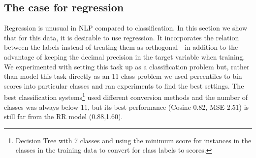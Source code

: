 \documentclass[11pt,letterpaper]{article}
\begin{document}
\begin{table}[ht!]
\caption{Cosine Test Results Breakdown.}
\label{tbl:submissionsCosineBreakdown}
\end{table}

\subsection{The case for regression} 
\label{subsec:forregression}
Regression is unusual in NLP compared to classification. In this section we show that for this data, it is desirable to use regression. %
It incorporates the relation between the labels instead of treating them as orthogonal---in addition to the advantage of keeping the decimal precision in the target variable when training.
We experimented with setting this task up as a classification problem but, rather than model this task directly as an 11 class problem we used percentiles to bin scores into particular classes and ran experiments to find the best settings. %
The best classification systems\footnote{Decision Tree with 7 classes and using the minimum score for instances in the classes in the training data to convert for class labels to scores.}  used different conversion methods and the number of classes was always below 11, but its best performance (Cosine 0.82, MSE 2.51) is still far from the {\sc RR} model (0.88,1.60).  
\end{document}
